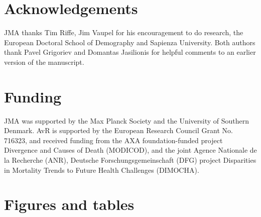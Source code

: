 \documentclass{article}
\begin{document}
\begin{spacing}{1.5}
\section*{Acknowledgements}
JMA thanks Tim Riffe, Jim Vaupel for his encouragement to do research, the European Doctoral School of Demography and Sapienza University. Both authors thank Pavel Grigoriev and Domantas Jasilionis for helpful comments to an earlier version of the manuscript. 

\section*{Funding}
JMA was supported by the Max Planck Society and the University of Southern Denmark. AvR is supported by the European Research Council Grant No. 716323, and received funding from the AXA foundation-funded project Divergence and Causes of Death (MODICOD), and the joint Agence Nationale de la Recherche (ANR), Deutsche Forschungsgemeinschaft (DFG) project Disparities in Mortality Trends to Future Health Challenges (DIMOCHA). 

\end{spacing}

\newpage

 

\newpage

\section*{Figures and tables}
\end{document}
